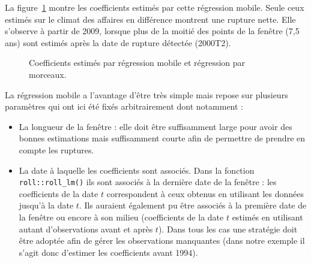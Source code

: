 \documentclass[
  a4paper,
  DIV=11,
  numbers=noendperiod,
  french]{scrartcl}
\newcommand\1{{\mathds 1}}
\theoremstyle{remark}
\begin{document}
La figure~\ref{fig-coef-rollreg} montre les coefficients estimés par
cette régression mobile. Seule ceux estimés sur le climat des affaires
en différence montrent une rupture nette. Elle s'observe à partir de
2009, lorsque plus de la moitié des points de la fenêtre (7,5 ans) sont
estimés après la date de rupture détectée (2000T2).

\begin{figure}

\caption{\label{fig-coef-rollreg}Coefficients estimés par régression
mobile et régression par morceaux.}


\end{figure}%

La régression mobile a l'avantage d'être très simple mais repose sur
plusieurs paramètres qui ont ici été fixés arbitrairement dont notamment
:

\begin{itemize}
\item
  La longueur de la fenêtre : elle doit être suffisamment large pour
  avoir des bonnes estimations mais suffisamment courte afin de
  permettre de prendre en compte les ruptures.
\item
  La date à laquelle les coefficients sont associés. Dans la fonction
  \texttt{roll::roll\_lm()} ils sont associés à la dernière date de la
  fenêtre : les coefficients de la date \(t\) correspondent à ceux
  obtenus en utilisant les données jusqu'à la date \(t.\) Ils auraient
  également pu être associés à la première date de la fenêtre ou encore
  à son milieu (coefficients de la date \(t\) estimés en utilisant
  autant d'observations avant et après \(t\)). Dans tous les cas une
  stratégie doit être adoptée afin de gérer les observations manquantes
  (dans notre exemple il s'agit donc d'estimer les coefficients avant
  1994).
\end{itemize}
\end{document}
